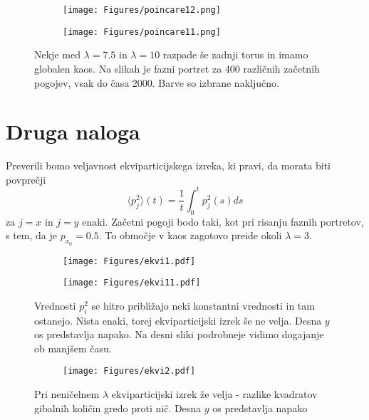 \documentclass{article}
\begin{document}
\begin{figure}[H]
\centering
\begin{subfigure}{.49\textwidth}
\texttt{[image: Figures/poincare12.png]}
\end{subfigure}
\begin{subfigure}{.49\textwidth}
\texttt{[image: Figures/poincare11.png]}
\end{subfigure}
\caption*{Nekje med $\lambda=7.5$ in $\lambda=10$ razpade še zadnji torus in imamo globalen kaos. Na slikah je fazni portret za 400 različnih začetnih pogojev, vsak do časa 2000. Barve so izbrane naključno.}
\end{figure} 

\section*{Druga naloga}

Preverili bomo veljavnost ekviparticijskega izreka, ki pravi, da morata biti povprečji
\begin{equation*}
\langle p_j^2 \rangle(t) = \frac{1}{t} \int_0^t p_j^2(s) ds 
\end{equation*}
za $j=x$ in $j=y$ enaki.
Začetni pogoji bodo taki, kot pri risanju faznih portretov, s tem, da je $p_{x_0} = 0.5$. To območje v kaos zagotovo preide okoli $\lambda=3$.

\begin{figure}[H]
\centering
\begin{subfigure}{.49\textwidth}
\texttt{[image: Figures/ekvi1.pdf]}
\end{subfigure}
\begin{subfigure}{.49\textwidth}
\texttt{[image: Figures/ekvi11.pdf]}
\end{subfigure}
\caption*{Vrednosti $p_i^2$ se hitro približajo neki konstantni vrednosti in tam ostanejo. Nista enaki, torej ekviparticijski izrek še ne velja. Desna $y$ os predstavlja napako. Na desni sliki podrobneje vidimo dogajanje ob manjšem času.}
\end{figure}

\begin{figure}[H]
\centering
\begin{subfigure}{.7\textwidth}
\texttt{[image: Figures/ekvi2.pdf]}
\end{subfigure}
\caption*{Pri neničelnem $\lambda$ ekviparticijski izrek že velja - razlike kvadratov gibalnih količin gredo proti nič.  Desna $y$ os predstavlja napako}
\end{figure}
\end{document}
